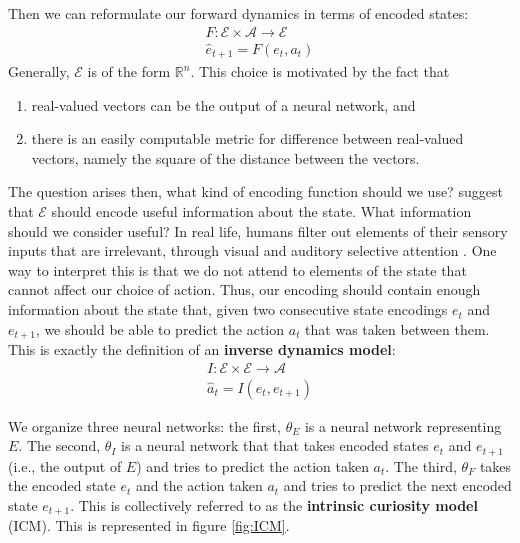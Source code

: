 \documentclass[journal, onecolumn, 12pt, draftclsnofoot]{IEEEtran}
\newcommand{\kword}[1]{\textbf{#1}}
\newcommand{\mc}[1]{\mathcal{#1}}
\begin{document}
	Then we can reformulate our forward dynamics in terms of encoded states:
	\begin{align}
		\label{eqn:forward}
		F:\mc{E} \times \mc{A} \to \mc{E} \\
		\hat{e}_{t+1} = F(e_t, a_t)
	\end{align}
	Generally, $\mc{E}$ is of the form $\mathbb{R}^n$. This choice is motivated by the fact that
	\begin{enumerate}
		\item real-valued vectors can be the output of a neural network, and
		\item there is an easily computable metric for difference between real-valued vectors, namely the square of the distance between the vectors.
	\end{enumerate}
	\par The question arises then, what kind of encoding function should we use? \cite{icm} suggest that $\mc{E}$ should encode useful information about the state. What information should we consider useful? In real life, humans filter out elements of their sensory inputs that are irrelevant, through visual and auditory selective attention \cite{selective}. One way to interpret this is that we do not attend to elements of the state that cannot affect our choice of action. Thus, our encoding should contain enough information about the state that, given two consecutive state encodings $e_t$ and $e_{t+1}$, we should be able to predict the action $a_t$ that was taken between them. This is exactly the definition of an \kword{inverse dynamics model}:
	\begin{align}
		\label{eqn:inverse}
		I:\mc{E} \times \mc{E} \to \mc{A} \\
		\hat{a}_{t} = I(e_t, e_{t+1})
	\end{align}
	\par We organize three neural networks: the first, $\theta_E$ is a neural network representing $E$. The second, $\theta_I$ is a neural network that that takes encoded states $e_t$ and $e_{t+1}$ (i.e., the output of $E$) and tries to predict the action taken $a_t$. The third, $\theta_F$ takes the encoded state $e_t$ and the action taken $a_t$ and tries to predict the next encoded state $e_{t+1}$. This is collectively referred to as the \kword{intrinsic curiosity model} (ICM). This is represented in figure \ref{fig:ICM}.
\end{document}
